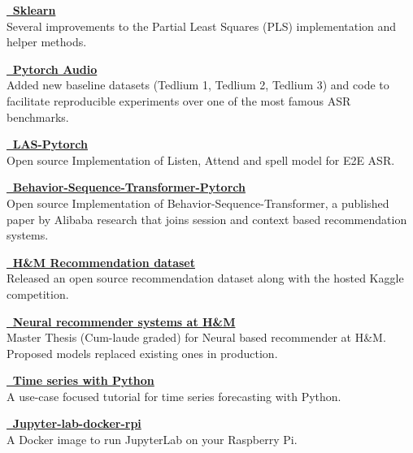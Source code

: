
{\textbf{\href{https://github.com/scikit-learn/scikit-learn}{\faGithub \, Sklearn }}} \\ Several improvements to the Partial Least Squares (PLS) implementation and helper methods. 

{\textbf{\href{https://github.com/pytorch/audio}{\faGithub \, Pytorch Audio }}} \\ Added new baseline datasets (Tedlium 1, Tedlium 2, Tedlium 3) and code to facilitate reproducible experiments over one of the most famous ASR benchmarks. 

{\textbf{\href{https://github.com/jiwidi/las-pytorch}{\faGithub \, LAS-Pytorch }}} \\ 
Open source Implementation of Listen, Attend and spell model for E2E ASR.


{\textbf{\href{https://github.com/jiwidi/Behavior-Sequence-Transformer-Pytorch}{\faGithub \, Behavior-Sequence-Transformer-Pytorch }}} \\ 
Open source Implementation of Behavior-Sequence-Transformer, a published paper by Alibaba research that joins session and context based recommendation systems.

{\textbf{\href{https://www.kaggle.com/competitions/h-and-m-personalized-fashion-recommendations/data}{\faGithub \, H\&M Recommendation dataset }}} \\ 
Released an open source recommendation dataset along with the hosted Kaggle competition.



{\textbf{\href{https://github.com/jiwidi/MASTER_THESIS/blob/master/thesis.pdf}{\faGithub \,  Neural recommender systems at H\&M  }}} \\ 
Master Thesis (Cum-laude graded) for Neural based recommender at H\&M. Proposed models replaced existing ones in production.



{\textbf{\href{https://github.com/jiwidi/time-series-forecasting-with-python}{\faGithub \,  Time series with Python  }}} \\ 
A use-case focused tutorial for time series forecasting with Python.



{\textbf{\href{https://github.com/jiwidi/jupyter-lab-docker-rpi}{\faGithub \, Jupyter-lab-docker-rpi}}} \\ 
A Docker image to run JupyterLab on your Raspberry Pi. 




